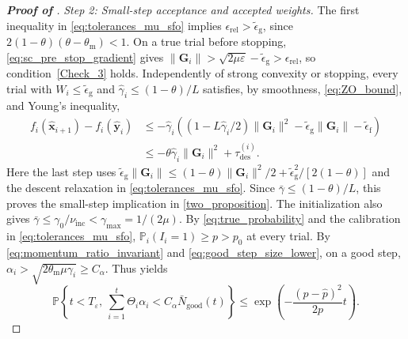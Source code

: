 \documentclass{article}
\begin{document}
\begin{proof}[\textbf{Proof of }]
\par\smallskip
\noindent\emph{Step 2: Small-step acceptance and accepted weights.}
The first inequality in \eqref{eq:tolerances_mu_sfo} implies
\(\epsilon_{\mathrm{rel}}>\widetilde\epsilon_{\mathrm{g}}\), since
\(2(1-\theta)(\theta-\theta_{\mathrm{m}})<1\).
On a true trial before stopping, \eqref{eq:sc_pre_stop_gradient} gives
\(\|\mathbf{G}_i\|>\sqrt{2\mu\varepsilon}
-\widetilde\epsilon_{\mathrm{g}}>\epsilon_{\mathrm{rel}}\), so condition~\eqref{Check_3}
holds. Independently of strong convexity or stopping, every trial with \(W_i\le\widetilde\epsilon_{\mathrm g}\) and \(\hat\gamma_i\le(1-\theta)/L\) satisfies, by smoothness, \eqref{eq:ZO_bound}, and Young's inequality,
\begin{equation}\label{eq:sfo_small_step_descent}
\begin{aligned}
f_i(\hat {\bm{x}}_{i+1})-f_i(\hat {\bm{y}}_i)
&\le-\hat\gamma_i\left((1-L\hat\gamma_i/2)\|\mathbf{G}_i\|^2
-\widetilde\epsilon_{\mathrm{g}}\|\mathbf{G}_i\|
-\widetilde\epsilon_{\mathrm{f}}\right)\\
&\le-\theta\hat\gamma_i\|\mathbf{G}_i\|^2+\tau_{\mathrm{des}}^{(i)}.
\end{aligned}
\end{equation}
Here the last step uses
\(\widetilde\epsilon_{\mathrm{g}}\|\mathbf{G}_i\|
\le(1-\theta)\|\mathbf{G}_i\|^2/2
+\widetilde\epsilon_{\mathrm{g}}^2/[2(1-\theta)]\) and the descent relaxation in \eqref{eq:tolerances_mu_sfo}.
Since \(\bar\gamma\le(1-\theta)/L\), this proves the small-step
implication in \eqref{two_proposition}.
The initialization also gives
\(\bar\gamma\le\gamma_0/\nu_{\mathrm{inc}}<\gamma_{\max}=1/(2\mu)\).
By \eqref{eq:true_probability} and the calibration in
\eqref{eq:tolerances_mu_sfo}, \(\mathbb P_i(I_i=1)\ge p>p_0\)
at every trial. By \eqref{eq:momentum_ratio_invariant} and
\eqref{eq:good_step_size_lower}, on a good step, \(\alpha_i>
\sqrt{2\theta_{\mathrm{m}}\mu\gamma_i}\ge C_\alpha\).
Thus  yields
\begin{equation}\label{eq:sfo_accepted_weight_tail}
\mathbb P\left\{t<T_\varepsilon,\
\sum_{i=1}^t\Theta_i\alpha_i<
C_\alpha\bar N_{\mathrm{good}}(t)\right\}
\le\exp\!\left(-\frac{(p-\hat p)^2}{2p}t\right).
\end{equation}


\end{proof}
\end{document}
